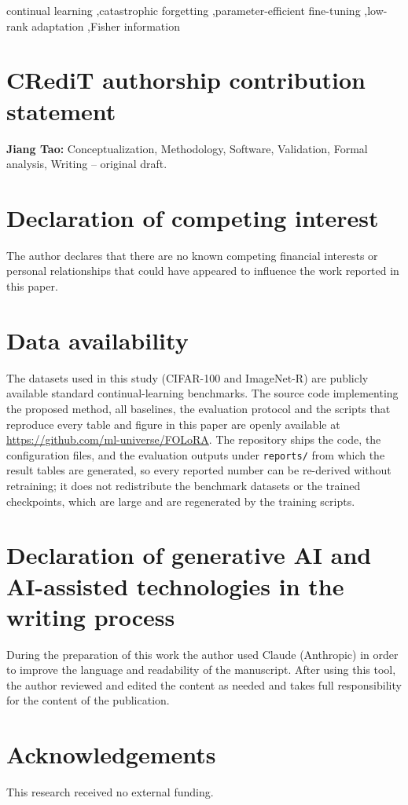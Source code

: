 \documentclass[review,12pt]{elsarticle}
\begin{document}
\begin{frontmatter}
\begin{keyword}
continual learning \sep catastrophic forgetting \sep parameter-efficient fine-tuning
\sep low-rank adaptation \sep Fisher information
\end{keyword}

\end{frontmatter}








\section*{CRediT authorship contribution statement}
\textbf{Jiang Tao:} Conceptualization, Methodology, Software, Validation,
Formal analysis, Writing -- original draft.

\section*{Declaration of competing interest}
The author declares that there are no known competing financial interests or personal
relationships that could have appeared to influence the work reported in this paper.

\section*{Data availability}
The datasets used in this study (CIFAR-100 and ImageNet-R) are publicly available
standard continual-learning benchmarks. The source code implementing the proposed method,
all baselines, the evaluation protocol and the scripts that reproduce every table and
figure in this paper are openly available at
\url{https://github.com/ml-universe/FOLoRA}. The repository ships the code, the
configuration files, and the evaluation outputs under \texttt{reports/} from which the
result tables are generated, so every reported number can be re-derived without
retraining; it does not redistribute the benchmark datasets or the trained checkpoints,
which are large and are regenerated by the training scripts.

\section*{Declaration of generative AI and AI-assisted technologies in the writing process}
During the preparation of this work the author used Claude (Anthropic) in order to
improve the language and readability of the manuscript. After using this tool, the author
reviewed and edited the content as needed and takes full responsibility for the
content of the publication.

\section*{Acknowledgements}
This research received no external funding.





\end{document}

